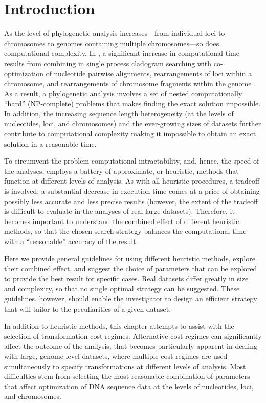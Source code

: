 \section{Introduction}

As the level of phylogenetic analysis increases---from individual loci to chromosomes to genomes containing multiple chromosomes---so does computational complexity. In \poy, a significant increase in computational time results from combining in single process cladogram searching with co-optimiza\-tion of nucleotide pairwise alignments, rearrangements of loci within a chromosome, and rearrangements of chromosome fragments within the genome . As a result, a phylogenetic analysis involves a set of nested computationally ``hard'' (NP-complete) problems that makes finding the exact solution impossible. In addition, the increasing sequence length heterogeneity (at the levels of nucleotides, loci, and chromosomes) and the ever-growing sizes of datasets further contribute to computational complexity making it impossible to obtain an exact solution in a reasonable time.

To circumvent the problem computational intractability, and, hence, the speed of the analyses, \poy employs a battery of approximate, or heuristic, methods that function at different levels of analysis. As with all heuristic procedures, a tradeoff is involved: a substantial decrease in execution time comes at a price of obtaining possibly less accurate  and less precise results (however, the extent of the tradeoff is difficult to evaluate in the analyses of real large datasets). Therefore, it becomes important to understand the combined effect of different heuristic methods, so that the chosen search strategy balances the computational time with a ``reasonable'' accuracy of the result.

Here we provide general guidelines for using different heuristic methods, explore their combined effect, and suggest the choice of parameters that can be explored to provide the best result for specific cases. Real datasets differ greatly in size and complexity, so that no single optimal strategy can be suggested. These guidelines, however, should enable the investigator to design an efficient strategy that will tailor to the peculiarities of a given dataset.

In addition to heuristic methods, this chapter attempts to assist with the selection of transformation cost regimes. Alternative cost regimes can significantly affect the outcome of the analysis, that becomes particularly apparent in dealing with large, genome-level datasets, where multiple cost regimes are used simultaneously to specify transformations at different levels of analysis. Most difficulties stem from selecting the most reasonable combination of parameters that affect optimization of DNA sequence data at the levels of nucleotides, loci, and chromosomes.


